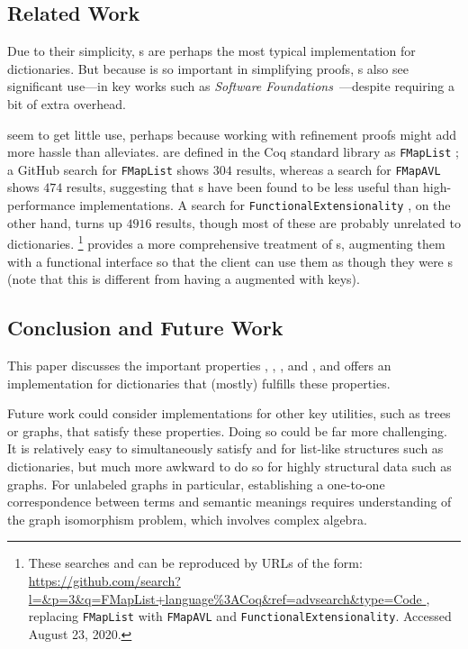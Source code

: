 \subsection{Related Work}

%
Due to their simplicity, {\sal}s are perhaps the most typical implementation for dictionaries.
%
But because \SemInj{} is so important in simplifying proofs, {\fpf}s also see significant use---in key works such as \emph{Software Foundations}~\cite[Maps]{Pierce:SF1}---despite requiring a bit of extra overhead.


\Cals{} seem to get little use, perhaps because working with refinement proofs might add more hassle than \SemInj{} alleviates.
%
\Cals{} are defined in the Coq standard library as \texttt{FMapList} \citep{FMapList}; a GitHub search for \texttt{FMapList} shows $304$ results,
%
whereas a search for \texttt{FMapAVL} shows $474$ results, suggesting that {\cal}s have been found to be less useful than high-performance implementations.
%
A search for \texttt{FunctionalExtensionality} \citep{FunExt}, on the other hand, turns up $4916$ results, though most of these are probably unrelated to dictionaries.%
\footnote{\hspace{0.01in}%
%
These searches and can be reproduced by URLs of the form:
\url{https://github.com/search?l=\&p=3\&q=FMapList+language\%3ACoq\&ref=advsearch\&type=Code },
replacing \texttt{FMapList} with \texttt{FMapAVL} and \texttt{FunctionalExtensionality}.
%
Accessed August 23, 2020.
%
}
%
\citet{Amorim:fmap} provides a more comprehensive treatment of {\cal}s, augmenting them with a functional interface so that the client can
%
use them as though they were {\fpf}s (note that this is different from having a \fpf{} augmented with keys).


\subsection{Conclusion and Future Work}
%
This paper discusses the important properties \SemTot, \SemInj, \EqDec, and \EzDstr, and offers an implementation for dictionaries that (mostly) fulfills these properties.

Future work could consider implementations for other key utilities, such as trees or graphs, that satisfy these properties.
%
Doing so could be far more challenging.
%
It is relatively easy to simultaneously satisfy \SemTot{} and \SemInj{} for list-like structures such as dictionaries,
%
but much more awkward to do so for highly structural data such as graphs. For unlabeled graphs in particular, establishing a one-to-one correspondence between terms and
%
semantic meanings requires understanding of the graph isomorphism problem, which involves complex algebra.

